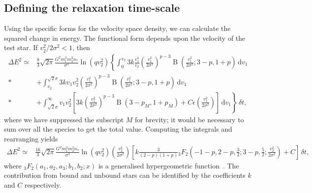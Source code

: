 \documentclass[useAMS,usedcolumn,usegraphicx,usenatbib]{mn2e}
\DeclareMathOperator{\Beta}{B}
\newcommand{\dd}{\ensuremath{\mathrm{d}}}
\newcommand{\intd}[4]{\ensuremath{\displaystyle \int_{#1}^{#2}{#3}\,\dd{#4}}}
\begin{document}
\begin{onecolumn}
\subsection{Defining the relaxation time-scale}

Using the specific forms for the velocity space density, we can calculate the squared change in energy. The functional form depends upon the velocity of the test star. If $v_2^2/2\sigma^2 < 1$, then
\begin{align}
\Delta E^2 \simeq {} & \frac{8}{3}\sqrt{2\pi}\frac{G^2m_1^2 m_2^2n_\ast}{\sigma^3}\ln\left(qv_2^2\right)\left\{\intd{0}{v_2}{3k\frac{v_1^4}{v_2}\left(\frac{v_1^2}{2\sigma^2}\right)^{p-3} \Beta\left(\frac{v_1^2}{2\sigma^2};3 - p, 1 + p\right)}{v_1} \right. \nonumber\\*
 & + \left. \intd{v_2}{\sqrt{2}\sigma}{3kv_1v_2^2\left(\frac{v_1^2}{2\sigma^2}\right)^{p-3} \Beta\left(\frac{v_1^2}{2\sigma^2};3 - p, 1 + p\right)}{v_1} \right. \nonumber\\*
 & + \left. \intd{\sqrt{2}\sigma}{\infty}{v_1v_2^2\left[3 k\left(\frac{v_1^2}{2\sigma^2}\right)^{p-3}\Beta\left(3 - p_M, 1 + p_M\right) + C\epsilon\left(\frac{v_1^2}{2\sigma^2}\right)\right]}{v_1}\right\}\,\delta t,
\end{align}
where we have suppressed the subscript $M$ for brevity; it would be necessary to sum over all the species to get the total value. Computing the integrals and rearranging yields
\begin{align}
\Delta E^2 \simeq {} & \frac{16}{3}\sqrt{2\pi}\frac{G^2m_1^2 m_2^2n_\ast}{\sigma^3}\ln\left(qv_2^2\right) \left(\frac{v_2^2}{2\sigma^2}\right) \left[k \frac{3}{(2 - p)(1 + p)}{_3F_2}\left(-1-p,2-p,\frac{3}{2};3-p,\frac{5}{2};\frac{v_2^2}{2\sigma^2}\right) + C\right]\,\delta t,
\end{align}
where ${_3F_2}(a_1,a_2,a_3;b_1,b_2;x)$ is a generalised hypergeometric function~\citep[section 16]{Olver2010}. The contribution from bound and unbound stars can be identified by the coefficients $k$ and $C$ respectively.


\end{onecolumn}
\end{document}
